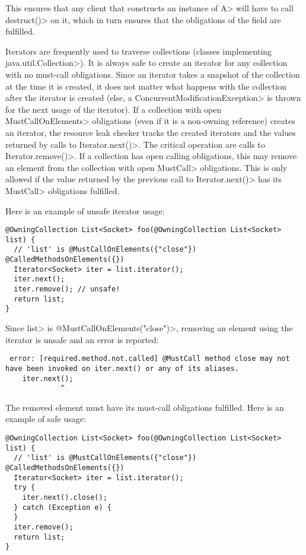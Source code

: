 This ensures that any client that constructs an instance of \<A> will have to call \<destruct()> on it, which in turn ensures that the obligations of the field are fulfilled.

Iterators are frequently used to traverse collections (classes implementing \<java.util.Collection>). It is always safe to create an iterator for any collection with no must-call obligations. Since an iterator takes a snapshot of the collection at the time it is created, it does not matter what happens with the collection after the iterator is created (else, a \<ConcurrentModificationException> is thrown for the next usage of the iterator).
If a collection with open \<MustCallOnElements> obligations (even if it is a non-owning reference) creates an iterator, the resource leak checker tracks the created iterators and the values returned by calls to \<Iterator.next()>. The critical operation are calls to \<Iterator.remove()>. If a collection has open calling obligations, this may remove an element from the collection with open \<MustCall> obligations. This is only allowed if the value returned by the previous call to \<Iterator.next()> has its \<MustCall> obligations fulfilled.

Here is an example of unsafe iterator usage:

\begin{verbatim}
@OwningCollection List<Socket> foo(@OwningCollection List<Socket> list) {
  // 'list' is @MustCallOnElements({"close"}) @CalledMethodsOnElements({})
  Iterator<Socket> iter = list.iterator();
  iter.next();
  iter.remove(); // unsafe!
  return list;
}
\end{verbatim}

Since \<list> is \<@MustCallOnElements("close")>, removing an element using the iterator is unsafe and an error is reported:
\begin{verbatim}
 error: [required.method.not.called] @MustCall method close may not have been invoked on iter.next() or any of its aliases.
    iter.next();
             ^
\end{verbatim}

The removed element must have its must-call obligations fulfilled. Here is an example of safe usage:

\begin{verbatim}
@OwningCollection List<Socket> foo(@OwningCollection List<Socket> list) {
  // 'list' is @MustCallOnElements({"close"}) @CalledMethodsOnElements({})
  Iterator<Socket> iter = list.iterator();
  try {
    iter.next().close();
  } catch (Exception e) {
  }
  iter.remove();
  return list;
}
\end{verbatim}

